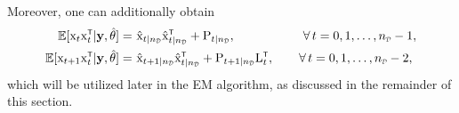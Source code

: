 %
Moreover, one can additionally obtain 
\begin{equation} \label{eq:correlation}
    \begin{split}
        \mathbb{E}[\vcx_t \vcx_t^{\tr}|\mathbf{y}, \hat{\vctheta}]   =&\,\, \hat{\vcx}_{t|{\nD}}\hat{\vcx}_{t|{\nD}}^\tr + \mxP_{t|{\nD}},
        \qquad\qquad\quad \ \;\!
        \forall\,t = 0,1, \ldots, \nD-1,
        \\
        \mathbb{E}[\vcx_{t+1} \vcx_t^{\tr}|\mathbf{y}, \hat{\vctheta}]   =&\,\, \hat{\vcx}_{t+1|{\nD}}\hat{\vcx}_{t|{\nD}}^\tr + \mxP_{t+1|{\nD}}\mxL_t^\tr,
        \qquad
        \forall\,t = 0,1, \ldots, \nD-2,
        \\
    \end{split}
\end{equation}
which will be utilized later in the EM algorithm, as discussed in the remainder of this section.


